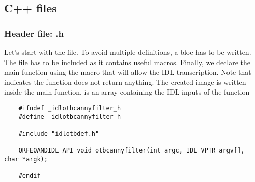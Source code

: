 \subsection{C++ files}
\subsubsection{Header file: .h}
Let's start with the  file. To avoid multiple definitions, a  bloc has to be written.
The  file has to be included as it contains useful macros.
Finally, we declare the main function using the macro  that will allow the IDL transcription.
Note that  indicates the function does not return anything. The created image is written inside the main function.
 is an array containing the IDL inputs of the function 
\begin{verbatim}
    #ifndef _idlotbcannyfilter_h
    #define _idlotbcannyfilter_h

    #include "idlotbdef.h"

    ORFEOANDIDL_API void otbcannyfilter(int argc, IDL_VPTR argv[], char *argk);

    #endif
\end{verbatim}

